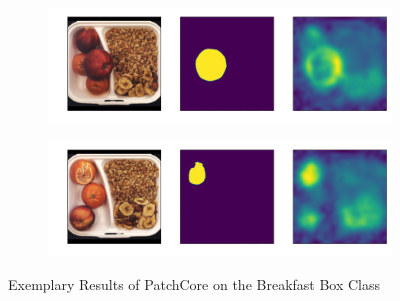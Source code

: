 \begin{figure}[htbp]
\begin{subfigure}[b]{0.3\textwidth}
    \end{subfigure}
    \begin{subfigure}[b]{0.3\textwidth}
        \centering
        \includegraphics[width=\textwidth]{figures/locopatchcoreresults/breakfast_box_test_structural_anomalies_024.png}


    \end{subfigure}
    \begin{subfigure}[b]{0.3\textwidth}
        \centering
        \includegraphics[width=\textwidth]{figures/locopatchcoreresults/breakfast_box_test_structural_anomalies_070.png}


    \end{subfigure}
    \caption{Exemplary Results of PatchCore on the Breakfast Box Class}
    \label{fig:PCBB}
\end{figure}